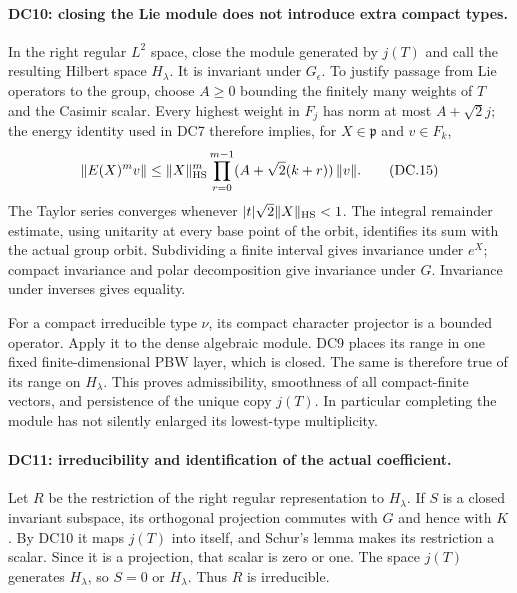 \paragraph{DC10: closing the Lie module does not introduce extra compact types.}
\label{claim:DC10}
In the right regular $L^2$ space, close the module generated by $j(T)$
and call the resulting Hilbert space $H_\lambda$.  It is invariant under
$G_\epsilon$.  To justify passage from Lie operators to the group, choose
$A\ge0$ bounding the finitely many weights of $T$ and the Casimir scalar.
Every highest weight in $F_j$ has norm at most $A+\sqrt2 j$; the energy
identity used in DC7 therefore implies, for $X\in\mathfrak p$ and
$v\in F_k$,
\[
 \|E(X)^m v\|\le \|X\|_{\rm HS}^{m}
       \prod_{r=0}^{m-1}(A+\sqrt2(k+r))\,\|v\|.               \tag{DC.15}
\]
The Taylor series converges whenever
$|t|\sqrt2\|X\|_{\rm HS}<1$.  The integral remainder estimate, using
unitarity at every base point of the orbit, identifies its sum with
the actual group orbit.  Subdividing a finite interval gives invariance
under $e^X$; compact invariance and polar decomposition give invariance
under $G$.  Invariance under inverses gives equality.

For a compact irreducible type $\nu$, its compact character projector
is a bounded operator.  Apply it to the dense algebraic module.  DC9
places its range in one fixed finite-dimensional PBW layer, which is
closed.  The same is therefore true of its range on $H_\lambda$.
This proves admissibility, smoothness of all compact-finite vectors,
and persistence of the unique copy $j(T)$.  In particular completing
the module has not silently enlarged its lowest-type multiplicity.

\paragraph{DC11: irreducibility and identification of the actual coefficient.}
\label{claim:DC11}
Let $R$ be the restriction of the right regular representation to
$H_\lambda$.  If $S$ is a closed invariant subspace, its orthogonal
projection commutes with $G$ and hence with $K$.  By DC10 it maps
$j(T)$ into itself, and Schur's lemma makes its restriction a scalar.
Since it is a projection, that scalar is zero or one.  The space $j(T)$
generates $H_\lambda$, so $S=0$ or $H_\lambda$.  Thus $R$ is irreducible.

